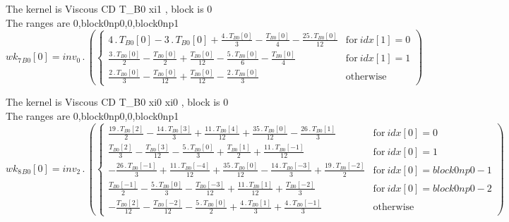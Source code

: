 \documentclass{article}
\begin{document}
\noindent The kernel is Viscous CD T_B0 xi1 , block is 0\\\noindent The ranges are 0,block0np0,0,block0np1\\\begin{dmath}{wk_{7}{_{B0}}}[{0}] = inv_0 \,.\, \left(\begin{cases} 4 \,.\, {T{_{B0}}}[{0}] - 3 \,.\, {T{_{B0}}}[{0}] + \frac{4 \,.\, {T{_{B0}}}[{0}]}{3} - \frac{{T{_{B0}}}[{0}]}{4} - \frac{25 \,.\, {T{_{B0}}}[{0}]}{12} & \text{for}\: {idx}[{1}] = 0 
\\\frac{3 \,.\, {T{_{B0}}}[{0}]}{2} - \frac{{T{_{B0}}}[{0}]}{2} + \frac{{T{_{B0}}}[{0}]}{12} - \frac{5 \,.\, {T{_{B0}}}[{0}]}{6} - \frac{{T{_{B0}}}[{0}]}{4} & \text{for}\: {idx}[{1}] = 1 \\\frac{2 \,.\, {T{_{B0}}}[{0}]}{3} - 
\frac{{T{_{B0}}}[{0}]}{12} + \frac{{T{_{B0}}}[{0}]}{12} - \frac{2 \,.\, {T{_{B0}}}[{0}]}{3} & \text{otherwise} \end{cases}\right)\end{dmath}

\noindent The kernel is Viscous CD T_B0 xi0 xi0 , block is 0\\\noindent The ranges are 0,block0np0,0,block0np1\\\begin{dmath}{wk_{8}{_{B0}}}[{0}] = inv_2 \,.\, \left(\begin{cases} \frac{19 \,.\, {T{_{B0}}}[{2}]}{2} - \frac{14 \,.\, {T{_{B0}}}[{3}]}{3} + \frac{11 \,.\, {T{_{B0}}}[{4}]}{12} + \frac{35 \,.\, {T{_{B0}}}[{0}]}{12} - \frac{26 \,.\, 
{T{_{B0}}}[{1}]}{3} & \text{for}\: {idx}[{0}] = 0 \\\frac{{T{_{B0}}}[{2}]}{3} - \frac{{T{_{B0}}}[{3}]}{12} - \frac{5 \,.\, {T{_{B0}}}[{0}]}{3} + \frac{{T{_{B0}}}[{1}]}{2} + \frac{11 \,.\, {T{_{B0}}}[{-1}]}{12} & \text{for}\: {idx}[{0}] = 1 \\- 
\frac{26 \,.\, {T{_{B0}}}[{-1}]}{3} + \frac{11 \,.\, {T{_{B0}}}[{-4}]}{12} + \frac{35 \,.\, {T{_{B0}}}[{0}]}{12} - \frac{14 \,.\, {T{_{B0}}}[{-3}]}{3} + \frac{19 \,.\, {T{_{B0}}}[{-2}]}{2} & \text{for}\: {idx}[{0}] = block0np0 - 1 
\\\frac{{T{_{B0}}}[{-1}]}{2} - \frac{5 \,.\, {T{_{B0}}}[{0}]}{3} - \frac{{T{_{B0}}}[{-3}]}{12} + \frac{11 \,.\, {T{_{B0}}}[{1}]}{12} + \frac{{T{_{B0}}}[{-2}]}{3} & \text{for}\: {idx}[{0}] = block0np0 - 2 \\- \frac{{T{_{B0}}}[{2}]}{12} - 
\frac{{T{_{B0}}}[{-2}]}{12} - \frac{5 \,.\, {T{_{B0}}}[{0}]}{2} + \frac{4 \,.\, {T{_{B0}}}[{1}]}{3} + \frac{4 \,.\, {T{_{B0}}}[{-1}]}{3} & \text{otherwise} \end{cases}\right)\end{dmath}
\end{document}
